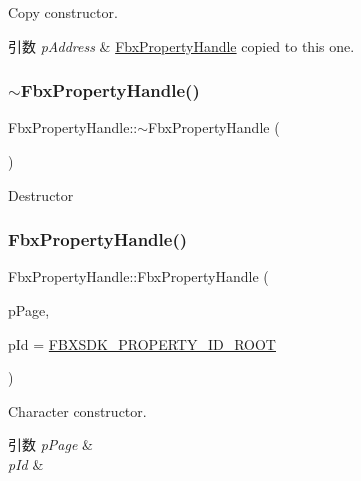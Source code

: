 Copy constructor. 
\begin{DoxyParams}{引数}
{\em p\+Address} & \hyperlink{class_fbx_property_handle}{Fbx\+Property\+Handle} copied to this one. \\
\hline
\end{DoxyParams}
\mbox{\label{class_fbx_property_handle_aaec3772d479b172d41c4b7585393fb14}} 
\subsubsection{\texorpdfstring{$\sim$\+Fbx\+Property\+Handle()}{~FbxPropertyHandle()}}
{\footnotesize\ttfamily Fbx\+Property\+Handle\+::$\sim$\+Fbx\+Property\+Handle (\begin{DoxyParamCaption}{ }\end{DoxyParamCaption})}



Destructor 

\mbox{\label{class_fbx_property_handle_adabd811d9e65f311dbbd5852abac7062}} 
\subsubsection{\texorpdfstring{Fbx\+Property\+Handle()}{FbxPropertyHandle()}\hspace{0.1cm}{\footnotesize\ttfamily [3/3]}}
{\footnotesize\ttfamily Fbx\+Property\+Handle\+::\+Fbx\+Property\+Handle (\begin{DoxyParamCaption}\item[{\hyperlink{class_fbx_property_page}{Fbx\+Property\+Page} $\ast$}]{p\+Page,  }\item[{\hyperlink{fbxtypes_8h_a088fa96de3b0b3ea69f0f6afef525dfb}{Fbx\+Int}}]{p\+Id = {\ttfamily \hyperlink{fbxpropertydef_8h_a291bdb6d8428dce8463143fa3aba2c34}{F\+B\+X\+S\+D\+K\+\_\+\+P\+R\+O\+P\+E\+R\+T\+Y\+\_\+\+I\+D\+\_\+\+R\+O\+OT}} }\end{DoxyParamCaption})}

Character constructor. 
\begin{DoxyParams}{引数}
{\em p\+Page} & \\
\hline
{\em p\+Id} & \\
\hline
\end{DoxyParams}



